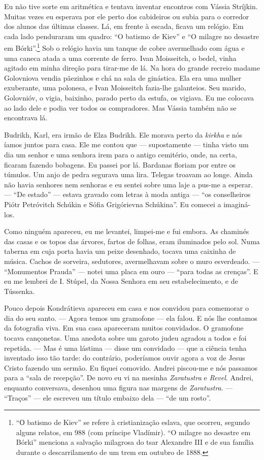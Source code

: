 Eu não tive sorte em aritmética e tentava inventar encontros com Vássia
Stríjkin. Muitas vezes eu esperava por ele perto dos cabideiros ou subia
para o corredor dos alunos das últimas classes. Lá, em frente à escada,
ficava um relógio. Em cada lado penduraram um quadro: ``O batismo de
Kiev'' e ``O milagre no desastre em Bórki''.\footnote{``О batismo de
  Kiev'' se refere à cristianização eslava, que ocorreu, segundo alguns
  relatos, em 988 (com príncipe Vladímir). ``O milagre no desastre em
  Bórki'' menciona a salvação milagrosa do tsar Alexandre III e de sua
  família durante o descarrilamento de um trem em outubro de 1888.} Sob
o relógio havia um tanque de cobre avermelhado com água e uma caneca
atada a uma corrente de ferro. Ivan Moisseitch, o bedel, vinha agitado
em minha direção para tirar-me de lá. Na hora do grande recreio madame
Golovniova vendia pãezinhos e chá na sala de ginástica. Ela era uma
mulher exuberante, uma polonesa, e Ivan Moisseitch fazia-lhe galanteios.
Seu marido, Golovnióv, o vigia, baixinho, parado perto da estufa, os
vigiava. Eu me colocava ao lado dele e podia ver todos os compradores.
Mas Vássia também não se encontrava lá.

Budrikh, Karl, era irmão de Elza Budrikh. Ele morava perto da
\emph{kirkha} e nós íamos juntos para casa. Ele me contou que ---
supostamente --- tinha visto um dia um senhor e uma senhora irem para o
antigo cemitério, onde, na certa, ficaram fazendo bobagens. Eu passei
por lá. Bardanas floriam por entre os túmulos. Um anjo de pedra segurava
uma lira. Telegas troavam ao longe. Ainda não havia senhores nem
senhoras e eu sentei sobre uma laje a pus-me a esperar. --- ``De
estado'' --- estava gravado com letras à moda antiga --- ``os
conselheiros Piótr Petróvitch Schúkin e Sófia Grigórievna Schúkina''. Eu
comecei a imaginá-los.

Como ninguém apareceu, eu me levantei, limpei-me e fui embora. As
chaminés das casas e os topos das árvores, fartos de folhas, eram
iluminados pelo sol. Numa taberna em cuja porta havia um peixe
desenhado, tocava uma caixinha de música. Cachos de sorveira, sedutores,
avermelhavam sobre o muro esverdeado. --- ``Monumentos Prauda'' ---
notei uma placa em ouro --- ``para todas as crenças''. E eu me lembrei
de I. Stúpel, da Nossa Senhora em seu estabelecimento, e de Tússenka.

Pouco depois Kondrátieva apareceu em casa e nos convidou para comemorar
o dia do seu santo. --- Agora temos um gramofone --- ela falou. E nós
lhe contamos da fotografia viva. Em sua casa apareceram muitos
convidados. O gramofone tocava cançonetas. Uma anedota sobre um garoto
judeu agradou a todos e foi repetida. --- Mas é uma lástima --- disse um
convidado --- que a ciência tenha inventado isso tão tarde: do
contrário, poderíamos ouvir agora a voz de Jesus Cristo fazendo um
sermão. Eu fiquei comovido. Andrei piscou-me e nós passamos para a
``sala de recepção''. De novo eu vi na mesinha \emph{Zaratustra} e
\emph{Revel}. Andrei, enquanto conversava, desenhou uma figura nas
margens de \emph{Zaratustra}. --- ``Traços'' --- ele escreveu um título
embaixo dela --- ``de um rosto''.

